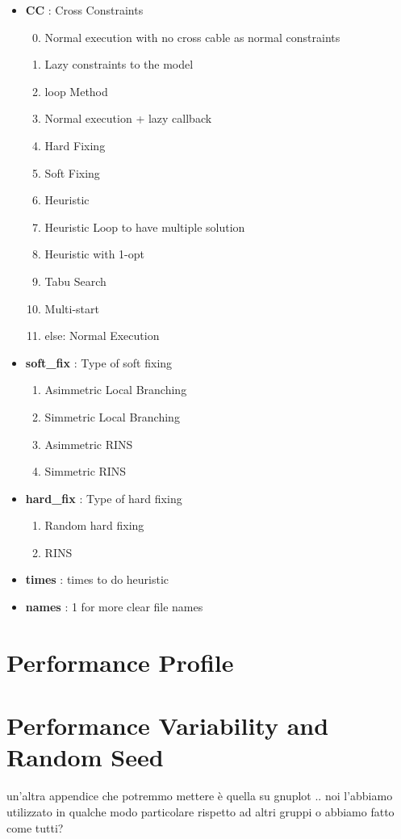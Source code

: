 \begin{appendices}
\begin{itemize}
\item \textbf{CC} : Cross Constraints
\begin{enumerate}\setcounter{enumi}{-1}
\setlength{\parskip}{0pt}
\setlength{\itemsep}{0pt plus 1pt}
	\item Normal execution with no cross cable as normal constraints
	\item Lazy constraints to the model
	\item loop Method
	\item Normal execution + lazy callback
	\item Hard Fixing
	\item Soft Fixing
	\item Heuristic
	\item Heuristic Loop to have multiple solution
	\item Heuristic with 1-opt
	\item Tabu Search
	\item Multi-start
	\item[] else: Normal Execution
\end{enumerate}
\item \textbf{soft\_fix} : Type of soft fixing
\begin{enumerate}\setcounter{enumi}{0}
\setlength{\parskip}{0pt}
\setlength{\itemsep}{0pt plus 1pt}
	\item Asimmetric Local Branching
	\item Simmetric Local Branching
	\item Asimmetric RINS
	\item Simmetric RINS
\end{enumerate}
\item \textbf{hard\_fix} : Type of hard fixing
\begin{enumerate}\setcounter{enumi}{0}
\setlength{\parskip}{0pt}
\setlength{\itemsep}{0pt plus 1pt}
	\item Random hard fixing
	\item RINS
\end{enumerate}
\item \textbf{times} : times to do heuristic
\item \textbf{names} : 1 for more clear file names
\end{itemize}

\chapter{Performance Profile}

\chapter{Performance Variability and Random Seed}
un'altra appendice che potremmo mettere è quella su gnuplot .. noi l'abbiamo utilizzato in qualche modo particolare rispetto ad altri gruppi o abbiamo fatto come tutti? 
















\end{appendices}
